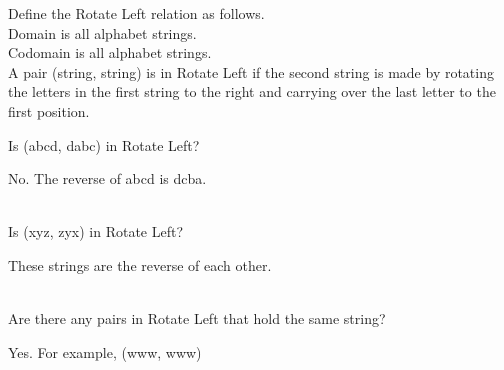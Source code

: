 \documentclass{ximera}
\begin{document}
\begin{question}

Define the Rotate Left relation as follows. \\
Domain is all alphabet strings. \\
Codomain is all alphabet strings. \\
A pair (string, string) is in Rotate Left if the second string is made by rotating the letters in the first string to the right and carrying over the last letter to the first position.


Is (abcd, dabc) in Rotate Left?
\begin{multipleChoice}
\end{multipleChoice}
\begin{feedback}
No. The reverse of abcd is dcba.
\end{feedback}

\quad \\
Is (xyz, zyx) in Rotate Left?
\begin{multipleChoice}
\end{multipleChoice}
\begin{feedback}
These strings are the reverse of each other.
\end{feedback}

\quad \\
Are there any pairs in Rotate Left that hold the same string?
\begin{multipleChoice}
\end{multipleChoice}
\begin{feedback}
Yes. For example, (www, www)
\end{feedback}

\end{question}
\end{document}
